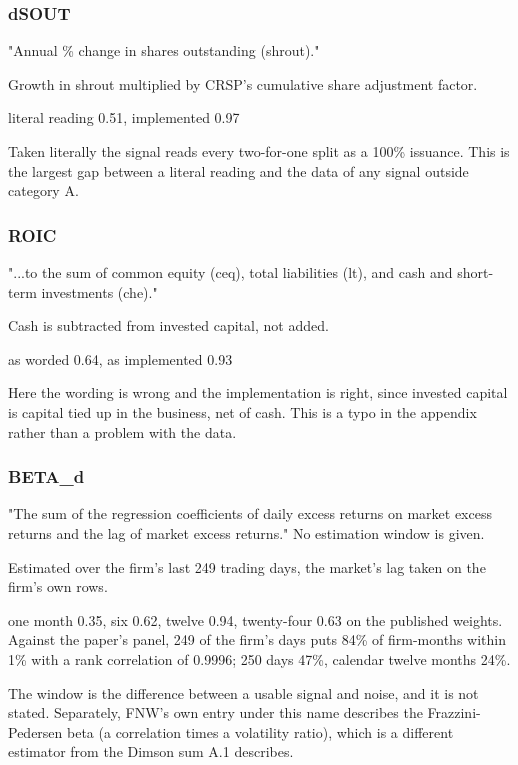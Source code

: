 \documentclass[11pt]{article}
\begin{document}
\subsubsection*{dSOUT}
\begin{description}[leftmargin=2.4cm,labelwidth=2.2cm,font=\normalfont\bfseries,style=sameline]
\item[Documented:] "Annual \% change in shares outstanding (shrout)."
\item[Implemented:] Growth in shrout multiplied by CRSP's cumulative share adjustment factor.
\item[Evidence:] literal reading 0.51, implemented 0.97
\item[Why it matters:] Taken literally the signal reads every two-for-one split as a 100\% issuance. This is the largest gap between a literal reading and the data of any signal outside category A.
\end{description}
\subsubsection*{ROIC}
\begin{description}[leftmargin=2.4cm,labelwidth=2.2cm,font=\normalfont\bfseries,style=sameline]
\item[Documented:] "...to the sum of common equity (ceq), total liabilities (lt), and cash and short-term investments (che)."
\item[Implemented:] Cash is subtracted from invested capital, not added.
\item[Evidence:] as worded 0.64, as implemented 0.93
\item[Why it matters:] Here the wording is wrong and the implementation is right, since invested capital is capital tied up in the business, net of cash. This is a typo in the appendix rather than a problem with the data.
\end{description}
\subsubsection*{BETA\_d}
\begin{description}[leftmargin=2.4cm,labelwidth=2.2cm,font=\normalfont\bfseries,style=sameline]
\item[Documented:] "The sum of the regression coefficients of daily excess returns on market excess returns and the lag of market excess returns." No estimation window is given.
\item[Implemented:] Estimated over the firm's last 249 trading days, the market's lag taken on the firm's own rows.
\item[Evidence:] one month 0.35, six 0.62, twelve 0.94, twenty-four 0.63 on the published weights. Against the paper's panel, 249 of the firm's days puts 84\% of firm-months within 1\% with a rank correlation of 0.9996; 250 days 47\%, calendar twelve months 24\%.
\item[Why it matters:] The window is the difference between a usable signal and noise, and it is not stated. Separately, FNW's own entry under this name describes the Frazzini-Pedersen beta (a correlation times a volatility ratio), which is a different estimator from the Dimson sum A.1 describes.
\end{description}
\end{document}

